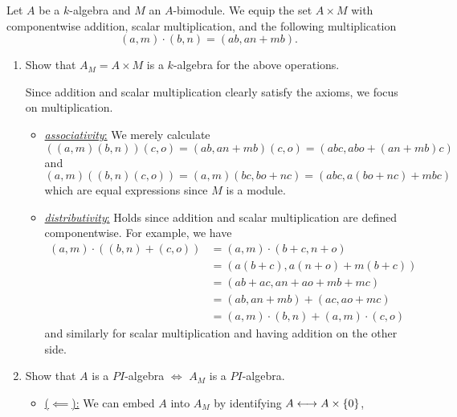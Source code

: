 \documentclass[a4paper, 12pt]{article}
\begin{document}
\begin{Exercise}
    Let $A$ be a $k$-algebra and $M$ an $A$-bimodule.
    We equip the set $A \times M$ with componentwise addition, scalar multiplication, and the following multiplication
    \[
        (a, m) \cdot (b, n) = (ab, an + mb).
    \]
    \begin{enumerate}[label=(\alph*)]
        \item Show that $A_M = A \times M$ is a $k$-algebra for the above operations.

            Since addition and scalar multiplication clearly satisfy the axioms, we focus on multiplication.
            \begin{itemize}
                \item \underline{\textit{associativity}:}
                    We merely calculate
                    \[
                        \left( (a, m)(b,n) \right)(c, o) = (ab, an + mb)(c,o) = (abc, abo + (an+mb)c)
                    \]
                    and
                    \[
                        (a,m)\left( (b,n)(c,o) \right) = (a,m)(bc, bo + nc) = (abc, a(bo + nc) + mbc)
                    \]
                    which are equal expressions since $M$ is a module.
                \item \underline{\textit{distributivity}:}
                    Holds since addition and scalar multiplication are defined componentwise.
                    For example, we have
                    \begin{align*}
                        (a, m)\cdot\left( (b, n) + (c, o) \right)
                        &= (a, m) \cdot (b + c, n + o) \\
                        &= (a(b + c), a(n+o) + m(b + c)) \\
                        &= (ab + ac, an + ao + mb + mc) \\
                        &= (ab, an + mb) + (ac, ao + mc) \\
                        &= (a,m)\cdot(b,n) + (a,m)\cdot(c,o)
                    \end{align*}
                    and similarly for scalar multiplication and having addition on the other side.
            \end{itemize}
        \item Show that $A$ is a $PI$-algebra $\iff$ $A_M$ is a $PI$-algebra.
            \begin{itemize}
                \item \underline{($\impliedby$):}
                    We can embed $A$ into $A_M$ by identifying $A \longleftrightarrow A \times \left\{ 0 \right\}$,

\end{itemize}
\end{enumerate}
\end{Exercise}
\end{document}
